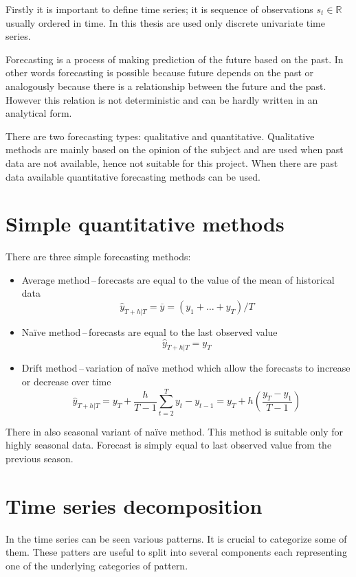 Firstly it is important to define time series; it is sequence of observations
$ s_t \in \mathbb{R} $ usually ordered in time. In this thesis are used only
discrete univariate time series. 

Forecasting is a process of making prediction of the future based 
on the past. In other words forecasting is possible because  
future depends on the past or analogously because there is a relationship
between the future and the past. However this relation is not deterministic and 
can be hardly written in an analytical form.


There are two forecasting types: qualitative and quantitative.
Qualitative methods are mainly based on the opinion of the subject and are used 
when past data are not available, hence not suitable for this project. 
When there are past data available quantitative forecasting methods can be used. 

\section{Simple quantitative methods}

There are three simple forecasting methods:
\begin{itemize}
    \item Average method\,--\,forecasts are equal to the value of the mean of
        historical data 
        $$ \hat{y}_{T+h|T} = \overline{y} = (y_{1}+ \dots + y_{T}) / T $$
    \item Na\"{i}ve method\,--\,forecasts are equal to the last observed value
        $$ \hat{y}_{T+h|T} = y_{T} $$ 
    \item Drift method\,--\,variation of na\"{i}ve method which allow the
        forecasts to increase or decrease over time
        $$ \hat{y}_{T+h|T} = y_{T} + \frac{h}{T-1} \sum_{t=2}^T{y_{t} - y_{t-1}} = 
        y_{T} + h(\frac{y_{T}-y_{1}}{T-1}) $$
\end{itemize}
There in also seasonal variant of na\"{i}ve method. This method is suitable only
for highly seasonal data. Forecast is simply equal to last observed value from
the previous season.

\section{Time series decomposition}
In the time series can be seen various patterns. It is crucial to categorize
some of them. These patters are useful to split into several components 
each representing one of the underlying categories of pattern.

